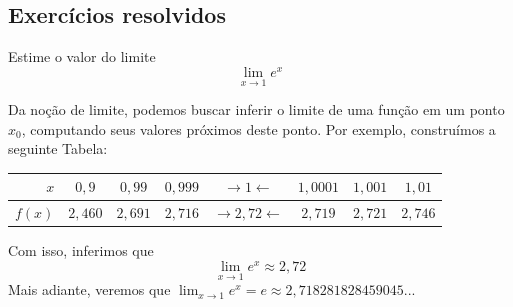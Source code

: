 \cleardoublepage\documentclass[../main.tex]{subfiles}
\begin{document}
\subsection{Exercícios resolvidos}

\begin{exeresol}
  Estime o valor do limite
  \begin{equation*}
    \lim_{x\to 1} e^x
  \end{equation*}
  \begin{resol}
 Da noção de limite, podemos buscar inferir o limite de uma função em um ponto $x_0$, computando seus valores próximos deste ponto. Por exemplo, construímos a seguinte Tabela:
  
  \begin{tabular}{r|ccc|c|ccc}
    $x$ & $0,9$ & $0,99$ & $0,999$ & $\rightarrow 1 \leftarrow$ & $1,0001$ & $1,001$ & $1,01$\\\hline
    $f(x)$ & $2,460$ & $2,691$ & $2,716$ & $\rightarrow 2,72 \leftarrow$ & $2,719$ & $2,721$ & $2,746$
  \end{tabular}
  
  Com isso, inferimos que
  \begin{equation*}
    \lim_{x\to 1} e^x \approx 2,72
  \end{equation*}
  Mais adiante, veremos que $\lim_{x\to 1} e^x = e \approx 2,718281828459045 ...$
\end{resol}
\end{exeresol}
\end{document}
